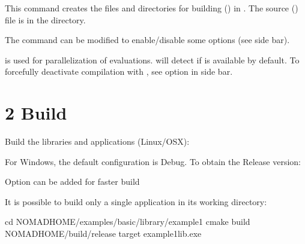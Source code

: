 \documentclass[letterpaper,10pt,english]{sphinxmanual}
\begin{document}
\sphinxAtStartPar
This command creates the files and directories for building () in . The source ()  file is in the  directory.

\sphinxAtStartPar
The command can be modified to enable/disable some options (see side bar).

\sphinxAtStartPar
{} is used for parallelization of evaluations.  will detect if  is available by default. To forcefully deactivate compilation with , see option in side bar.


\section{2\sphinxhyphen{} Build}
\label{\detokenize{Installation:build}}
\sphinxAtStartPar
Build the libraries and applications (Linux/OSX):

\begin{sphinxVerbatim}[commandchars=\\\{\}]
  
\end{sphinxVerbatim}

\sphinxAtStartPar
For Windows, the default configuration is Debug. To obtain the Release version:

\begin{sphinxVerbatim}[commandchars=\\\{\}]
    
\end{sphinxVerbatim}

\sphinxAtStartPar
Option  can be added for faster build

\sphinxAtStartPar
It is possible to build only a single application in its working directory:

\begin{sphinxVerbatim}[commandchars=\\\{\}]
cd \PYGZdl{}NOMAD\PYGZus{}HOME/examples/basic/library/example1
cmake \PYGZhy{}\PYGZhy{}build \PYGZdl{}NOMAD\PYGZus{}HOME/build/release \PYGZhy{}\PYGZhy{}target example1\PYGZus{}lib.exe
\end{sphinxVerbatim}
\end{document}
